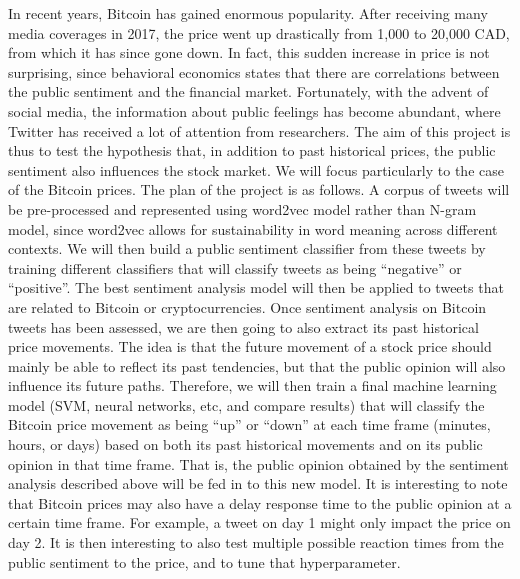 \documentclass[12pt,a4paper]{report}
\begin{document}
\par \qquad In recent years, Bitcoin has gained enormous popularity. After receiving many media coverages in 2017, the price went up drastically from 1,000 to 20,000 CAD, from which it has since gone down. In fact, this sudden increase in price is not surprising, since behavioral economics states that there are correlations between the public sentiment and the financial market. Fortunately, with the advent of social media, the information about public feelings has become abundant, where Twitter has received a lot of attention from researchers. The aim of this project is thus to test the hypothesis that, in addition to past historical prices, the public sentiment also influences the stock market. We will focus particularly to the case of the Bitcoin prices. The plan of the project is as follows. A corpus of tweets will be pre-processed and represented using word2vec model rather than N-gram model, since word2vec allows for sustainability in word meaning across different contexts. We will then build a public sentiment classifier from these tweets by training different classifiers that will classify tweets as being ``negative'' or ``positive''. The best sentiment analysis model will then be applied to tweets that are related to Bitcoin or cryptocurrencies. Once sentiment analysis on Bitcoin tweets has been assessed, we are then going to also extract its past historical price movements. The idea is that the future movement of a stock price should mainly be able to reflect its past tendencies, but that the public opinion will also influence its future paths. Therefore, we will then train a final machine learning model (SVM, neural networks, etc, and compare results) that will classify the Bitcoin price movement as being ``up'' or ``down'' at each time frame (minutes, hours, or days) based on both its past historical movements and on its public opinion in that time frame. That is, the public opinion obtained by the sentiment analysis described above will be fed in to this new model. It is interesting to note that Bitcoin prices may also have a delay response time to the public opinion at a certain time frame. For example, a tweet on day 1 might only impact the price on day 2. It is then interesting to also test multiple possible reaction times from the public sentiment to the price, and to tune that hyperparameter. 
\\
\end{document}
